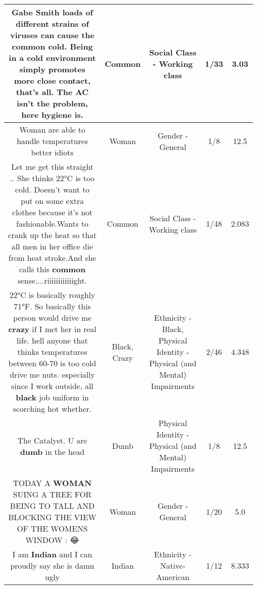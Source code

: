 \documentclass[11pt]{article}
\newlength\mylength
\begin{document}
\begin{center}
\begin{longtable}{|C{.65\mylength}|C{.30\mylength}|C{.12\mylength}|C{.12\mylength}|C{.12\mylength}|}
  \small Gabe Smith loads of different strains of viruses can cause the \textbf{common} cold. Being in a cold environment simply promotes more close contact, that's all. The AC isn't the problem, here hygiene is.\normalsize   & Common & Social Class - Working class & 1/33 & 3.03 \\  \hline
  \small Woman are able to handle temperatures better idiots\normalsize   & Woman & Gender - General & 1/8 & 12.5 \\  \hline
  \small Let me get this straight .. She thinks 22°C is too cold. Doesn't want to put on some extra clothes because it's not fashionable.Wants to crank up the heat so that all men in her office die from heat stroke.And she calls this \textbf{common} sense....riiiiiiiiiiiight.\normalsize   & Common & Social Class - Working class & 1/48 & 2.083 \\  \hline
  \small 22°C is basically roughly 71°F. So basically this person would drive me \textbf{crazy} if I met her in real life. hell anyone that thinks temperatures between 60-70 is too cold drive me nuts. especially since I work outside, all \textbf{black} job uniform in scorching hot whether.\normalsize   & Black, Crazy & Ethnicity - Black, Physical Identity - Physical (and Mental) Impairments & 2/46 & 4.348 \\  \hline
  \small The Catalyst.  U are \textbf{dumb} in the head\normalsize   & Dumb & Physical Identity - Physical (and Mental) Impairments & 1/8 & 12.5 \\  \hline
  \small TODAY A \textbf{WOMAN} SUING A TREE FOR BEING TO TALL AND BLOCKING THE VIEW OF THE WOMENS WINDOW : 😂\normalsize   & Woman & Gender - General & 1/20 & 5.0 \\  \hline
  \small I am \textbf{Indian} and I can proudly say she is damn ugly\normalsize   & Indian & Ethnicity - Native-American & 1/12 & 8.333 \\  \hline

\end{longtable}
\end{center}
\end{document}
